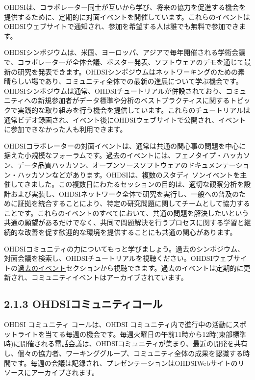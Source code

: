 \documentclass[
  11pt]{book}
\theoremstyle{definition}
\theoremstyle{definition}
\theoremstyle{definition}
\theoremstyle{definition}
\theoremstyle{remark}
\begin{document}
OHDSIは、コラボレーター同士が互いから学び、将来の協力を促進する機会を提供するために、定期的に対面イベントを開催しています。これらのイベントはOHDSIウェブサイトで通知され、参加を希望する人は誰でも無料で参加できます。

OHDSIシンポジウムは、米国、ヨーロッパ、アジアで毎年開催される学術会議で、コラボレーターが全体会議、ポスター発表、ソフトウェアのデモを通じて最新の研究を発表できます。OHDSIシンポジウムはネットワーキングのための素晴らしい場であり、コミュニティ全体での最新の進展について学ぶ機会です。OHDSIシンポジウムは通常、OHDSIチュートリアルが併設されており、コミュニティへの新規参加者がデータ標準や分析のベストプラクティスに関するトピックで実践的な取り組みを行う機会を提供しています。これらのチュートリアルは通常ビデオ録画され、イベント後にOHDSIウェブサイトで公開され、イベントに参加できなかった人も利用できます。

OHDSIコラボレーターの対面イベントは、通常は共通の関心事の問題を中心に据えた小規模なフォーラムです。過去のイベントには、フェノタイプ・ハッカソン、データ品質ハッカソン、オープンソースソフトウェアのドキュメンテーション・ハッカソンなどがあります。OHDSIは、複数のスタディ ソンイベントを主催してきました。この複数日にわたるセッションの目的は、適切な観察分析を設計および実装し、OHDSIネットワーク全体で研究を実行し、一般への普及のために証拠を統合することにより、特定の研究問題に関してチームとして協力することです。これらのイベントのすべてにおいて、共通の問題を解決したいという共通の願望があるだけでなく、共同で問題解決を行うプロセスに関する学習と継続的な改善を促す歓迎的な環境を提供することにも共通の関心があります。

OHDSIコミュニティの力についてもっと学びましょう。過去のシンポジウム、対面会議を検索し、OHDSIチュートリアルを視聴ください。OHDSIウェブサイトの\href{https://www.ohdsi.org/past-events/}{過去のイベント}セクションから視聴できます。過去のイベントは定期的に更新され、コミュニティイベントはアーカイブされています。

\subsection{2.1.3 OHDSIコミュニティコール}\label{ohdsiux30b3ux30dfux30e5ux30cbux30c6ux30a3ux30b3ux30fcux30eb}

OHDSI コミュニティ コールは、OHDSI コミュニティ内で進行中の活動にスポットライトを当てる毎週の機会です。毎週火曜日の午前11時から12時(東部標準時)に開催される電話会議は、OHDSIコミュニティが集まり、最近の開発を共有し、個々の協力者、ワーキンググループ、コミュニティ全体の成果を認識する時間です。毎週の会議は記録され、プレゼンテーションはOHDSIWebサイトのリソースにアーカイブされます。
\end{document}
